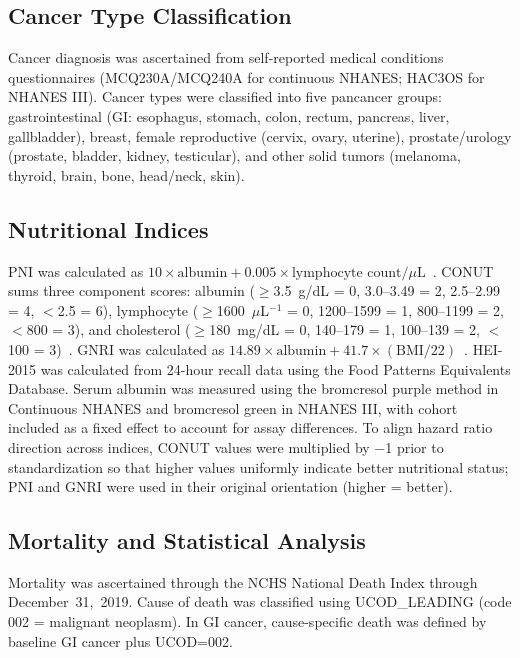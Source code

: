 \documentclass[review]{elsarticle}
\begin{document}
\subsection{Cancer Type Classification}

Cancer diagnosis was ascertained from self-reported medical conditions questionnaires (MCQ230A/MCQ240A for continuous NHANES; HAC3OS for NHANES III). Cancer types were classified into five pancancer groups: gastrointestinal (GI: esophagus, stomach, colon, rectum, pancreas, liver, gallbladder), breast, female reproductive (cervix, ovary, uterine), prostate/urology (prostate, bladder, kidney, testicular), and other solid tumors (melanoma, thyroid, brain, bone, head/neck, skin).

\subsection{Nutritional Indices}

PNI was calculated as $10 \times \text{albumin} + 0.005 \times \text{lymphocyte count}/\mu\text{L}$~\cite{onodera1984}. CONUT sums three component scores: albumin ($\ge$3.5~g/dL = 0, 3.0--3.49 = 2, 2.5--2.99 = 4, $<$2.5 = 6), lymphocyte ($\ge$1600~$\mu$L$^{-1}$ = 0, 1200--1599 = 1, 800--1199 = 2, $<$800 = 3), and cholesterol ($\ge$180~mg/dL = 0, 140--179 = 1, 100--139 = 2, $<$100 = 3)~\cite{ignacio2005}. GNRI was calculated as $14.89 \times \text{albumin} + 41.7 \times (\text{BMI}/22)$~\cite{bouillanne2005}. HEI-2015 was calculated from 24-hour recall data using the Food Patterns Equivalents Database. Serum albumin was measured using the bromcresol purple method in Continuous NHANES and bromcresol green in NHANES III, with cohort included as a fixed effect to account for assay differences. To align hazard ratio direction across indices, CONUT values were multiplied by $-$1 prior to standardization so that higher values uniformly indicate better nutritional status; PNI and GNRI were used in their original orientation (higher = better).

\subsection{Mortality and Statistical Analysis}

Mortality was ascertained through the NCHS National Death Index through December~31,~2019. Cause of death was classified using UCOD\_LEADING (code 002 = malignant neoplasm). In GI cancer, cause-specific death was defined by baseline GI cancer plus UCOD=002.
\end{document}
